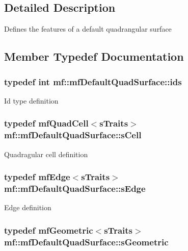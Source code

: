 \subsection{Detailed Description}
Defines the features of a default quadrangular surface 

\subsection{Member Typedef Documentation}
\hypertarget{structmf_1_1mfDefaultQuadSurface_af8fa333aced6c7736f6409852c3f013f}{
\subsubsection[{ids}]{\setlength{\rightskip}{0pt plus 5cm}typedef int {\bf mf::mfDefaultQuadSurface::ids}}}
\label{structmf_1_1mfDefaultQuadSurface_af8fa333aced6c7736f6409852c3f013f}
Id type definition \hypertarget{structmf_1_1mfDefaultQuadSurface_aa4285fd8b26df0d7042c3412c587c069}{
\subsubsection[{sCell}]{\setlength{\rightskip}{0pt plus 5cm}typedef {\bf mfQuadCell}$<${\bf sTraits}$>$ {\bf mf::mfDefaultQuadSurface::sCell}}}
\label{structmf_1_1mfDefaultQuadSurface_aa4285fd8b26df0d7042c3412c587c069}
Quadragular cell definition \hypertarget{structmf_1_1mfDefaultQuadSurface_a7f1595081909265e8f53222c0fe7bc96}{
\subsubsection[{sEdge}]{\setlength{\rightskip}{0pt plus 5cm}typedef {\bf mfEdge}$<${\bf sTraits}$>$ {\bf mf::mfDefaultQuadSurface::sEdge}}}
\label{structmf_1_1mfDefaultQuadSurface_a7f1595081909265e8f53222c0fe7bc96}
Edge definition \hypertarget{structmf_1_1mfDefaultQuadSurface_a61318df86637b442010db8e044f08f18}{
\subsubsection[{sGeometric}]{\setlength{\rightskip}{0pt plus 5cm}typedef {\bf mfGeometric}$<${\bf sTraits}$>$ {\bf mf::mfDefaultQuadSurface::sGeometric}}}
